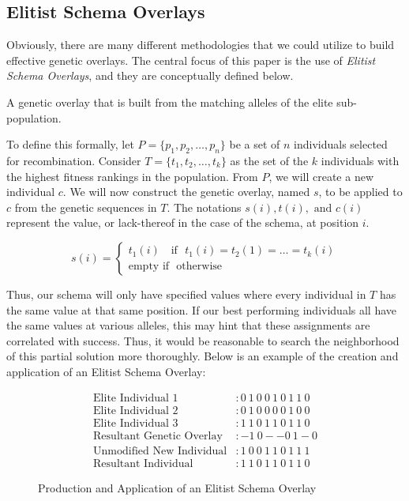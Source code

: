 \subsection*{Elitist Schema Overlays}
Obviously, there are many different methodologies that we could utilize to build effective genetic overlays. The central focus of this paper is the use of \emph{Elitist Schema Overlays}, and they are conceptually defined below.

\begin{eschema}
A genetic overlay that is built from the matching alleles of the elite sub-population.
\end{eschema}

To define this formally, let $P = \{p_1,p_2,\ldots,p_n\}$ be a set of $n$ individuals selected for recombination. Consider $T=\{t_1,t_2,\ldots,t_k\}$ as the set of the $k$ individuals with the highest fitness rankings in the population. From $P$, we will create a new individual $c$.  We will now construct the genetic overlay, named $s$, to be applied to $c$ from the genetic sequences in $T$. The notations $s(i), t(i), \text{ and } c(i)$ represent the value, or lack-thereof in the case of the schema, at position $i$.
 
 \begin{displaymath}
   s(i) = \left\{
     \begin{array}{lr}
       t_1(i) \text{~~~if~ } t_1(i) = t_2(1) = \ldots = t_k(i) \\
       \text{empty~} \text{if~ } \text{otherwise} 
     \end{array}
   \right.
\end{displaymath} 

Thus, our schema will only have specified values where every individual in $T$ has the same value at that same position. If our best performing individuals all have the same values at various alleles, this may hint that these assignments are correlated with success. Thus, it would be reasonable to search the neighborhood of this partial solution more thoroughly. Below is an example of the creation and application of an Elitist Schema Overlay:
\begin{figure}[h!]
\centering 
\begin{align*}
\text{Elite Individual 1} &: 0~1~0~0~1~0~1~1~0 			\\
\text{Elite Individual 2} &: 0~1~0~0~0~0~1~0~0 			\\
\text{Elite Individual 3} &: 1~1~0~1~1~0~1~1~0 			\\
\text{Resultant Genetic Overlay} &:   -1~0--0~1-0			\\
\text{Unmodified New Individual} &: 1~0~0~1~1~0~1~1~1	\\		
\text{Resultant Individual} &: 1~1~0~1~1~0~1~1~0
\end{align*}
\caption{Production and Application of an Elitist Schema Overlay}
\end{figure}

